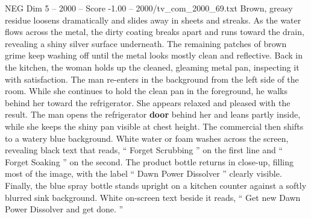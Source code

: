 \begin{textsample}{NEG Dim 5 – 2000 – Score -1.00 – 2000/tv\_com\_2000\_69.txt}
Brown, greasy residue loosens dramatically and slides away in sheets and streaks.
As the water flows across the metal, the dirty coating breaks apart and runs toward the drain, revealing a shiny silver surface underneath.
The remaining patches of brown grime keep washing off until the metal looks mostly clean and reflective.
Back in the kitchen, the woman holds up the cleaned, gleaming metal pan, inspecting it with satisfaction.
The man re-enters in the background from the left side of the room.
While she continues to hold the clean pan in the foreground, he walks behind her toward the refrigerator.
She appears relaxed and pleased with the result.
The man opens the refrigerator \textbf{door} behind her and leans partly inside, while she keeps the shiny pan visible at chest height.
The commercial then shifts to a watery blue background.
White water or foam washes across the screen, revealing black text that reads, “ Forget Scrubbing ” on the first line and “ Forget Soaking ” on the second.
The product bottle returns in close-up, filling most of the image, with the label “ Dawn Power Dissolver ” clearly visible.
Finally, the blue spray bottle stands upright on a kitchen counter against a softly blurred sink background.
White on-screen text beside it reads, “ Get new Dawn Power Dissolver and get done. ”

\end{textsample}
